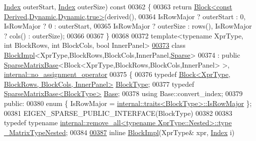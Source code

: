 \begin{DoxyCode}
      \hyperlink{group___core___module_a554f30542cc2316add4b1ea0a492ff02}{Index} outerStart, \hyperlink{group___core___module_a554f30542cc2316add4b1ea0a492ff02}{Index} outerSize)\textcolor{keyword}{ const}
00362 \textcolor{keyword}{}\{
00363   \textcolor{keywordflow}{return} \hyperlink{group___core___module_class_eigen_1_1_block}{Block<const Derived,Dynamic,Dynamic,true>}(derived(),
00364                                                   IsRowMajor ? outerStart : 0, IsRowMajor ? 0 : outerStart,
00365                                                   IsRowMajor ? outerSize : rows(), IsRowMajor ? cols() : 
      outerSize);
00366 
00367 \}
00368 
00372 \textcolor{keyword}{template}<\textcolor{keyword}{typename} XprType, \textcolor{keywordtype}{int} BlockRows, \textcolor{keywordtype}{int} BlockCols, \textcolor{keywordtype}{bool} InnerPanel>
\hyperlink{class_eigen_1_1_block_impl_3_01_xpr_type_00_01_block_rows_00_01_block_cols_00_01_inner_panel_00_01_sparse_01_4}{00373} \textcolor{keyword}{class }\hyperlink{class_eigen_1_1_block_impl}{BlockImpl}<XprType,BlockRows,BlockCols,InnerPanel,\hyperlink{struct_eigen_1_1_sparse}{Sparse}>
00374   : \textcolor{keyword}{public} \hyperlink{group___sparse_core___module_class_eigen_1_1_sparse_matrix_base}{SparseMatrixBase}<Block<XprType,BlockRows,BlockCols,InnerPanel> >, 
      \hyperlink{class_eigen_1_1internal_1_1no__assignment__operator}{internal::no\_assignment\_operator}
00375 \{
00376     \textcolor{keyword}{typedef} \hyperlink{group___core___module_class_eigen_1_1_block}{Block<XprType, BlockRows, BlockCols, InnerPanel>}
       \hyperlink{group___core___module_class_eigen_1_1_block}{BlockType};
00377     \textcolor{keyword}{typedef} \hyperlink{group___sparse_core___module_class_eigen_1_1_sparse_matrix_base}{SparseMatrixBase<BlockType>} \hyperlink{group___sparse_core___module_class_eigen_1_1_sparse_matrix_base}{Base};
00378     \textcolor{keyword}{using} Base::convert\_index;
00379 \textcolor{keyword}{public}:
00380     \textcolor{keyword}{enum} \{ IsRowMajor = \hyperlink{struct_eigen_1_1internal_1_1traits}{internal::traits<BlockType>::IsRowMajor} \};
00381     EIGEN\_SPARSE\_PUBLIC\_INTERFACE(BlockType)
00382 
00383     \textcolor{keyword}{typedef} \textcolor{keyword}{typename} \hyperlink{group___sparse_core___module}{internal::remove\_all<typename XprType::Nested>::type}
       \hyperlink{group___sparse_core___module}{\_MatrixTypeNested};
00384 
\hyperlink{class_eigen_1_1_block_impl_3_01_xpr_type_00_01_block_rows_00_01_block_cols_00_01_inner_panel_00_01_sparse_01_4_aa724feeda73e4d5d2330c6dced2d18f9}{00387}     \textcolor{keyword}{inline} \hyperlink{class_eigen_1_1_block_impl_3_01_xpr_type_00_01_block_rows_00_01_block_cols_00_01_inner_panel_00_01_sparse_01_4_aa724feeda73e4d5d2330c6dced2d18f9}{BlockImpl}(XprType& xpr, \hyperlink{group___core___module_a554f30542cc2316add4b1ea0a492ff02}{Index} i)

\end{DoxyCode}
